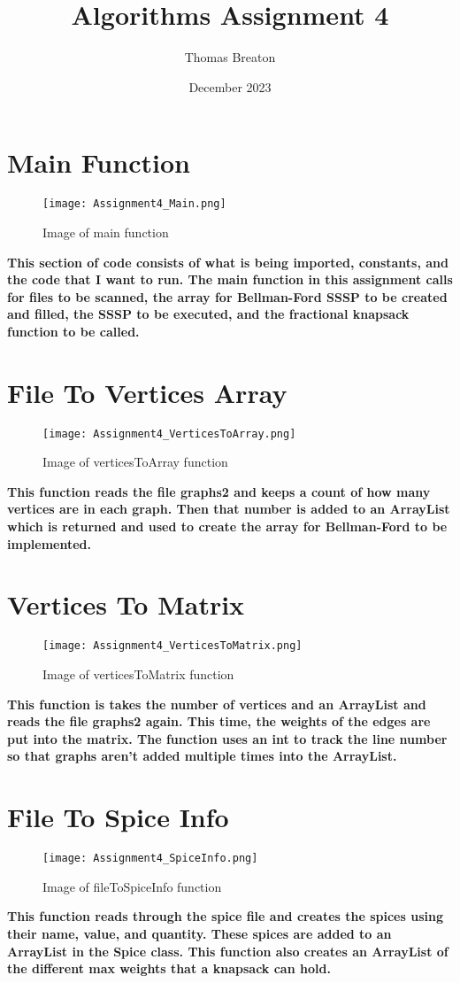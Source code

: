 \documentclass{article}
\title{Algorithms Assignment 4}
\author{Thomas Breaton }
\date{December 2023}
\begin{document}
\maketitle

\section{Main Function}
\begin{figure}[h]
    \centering
    \texttt{[image: Assignment4\_Main.png]}
    \caption{Image of main function}
    \label{fig:mainFunction}
\end{figure}
\textbf{This section of code consists of what is being imported, constants, and the code that I want to run. The main function in this assignment calls for files to be scanned, the array for Bellman-Ford SSSP to be created and filled, the SSSP to be executed, and the fractional knapsack function to be called.}
\newpage

\section{File To Vertices Array}
\begin{figure}[h]
    \centering
    \texttt{[image: Assignment4\_VerticesToArray.png]}
    \caption{Image of verticesToArray function}
    \label{fig:verticesToArray}
\end{figure}
\textbf{This function reads the file graphs2 and keeps a count of how many vertices are in each graph. Then that number is added to an ArrayList which is returned and used to create the array for Bellman-Ford to be implemented.}
\newpage

\section{Vertices To Matrix}
\begin{figure}[h]
    \centering
    \texttt{[image: Assignment4\_VerticesToMatrix.png]}
    \caption{Image of verticesToMatrix function}
    \label{fig:verticesToMatrixFunction}
\end{figure}
\textbf{This function is takes the number of vertices and an ArrayList and reads the file graphs2 again. This time, the weights of the edges are put into the matrix. The function uses an int to track the line number so that graphs aren't added multiple times into the ArrayList.}
\newpage

\section{File To Spice Info}
\begin{figure}[h]
    \centering
    \texttt{[image: Assignment4\_SpiceInfo.png]}
    \caption{Image of fileToSpiceInfo function}
    \label{fig:fileToSpiceInfoFunction}
\end{figure}
\textbf{This function reads through the spice file and creates the spices using their name, value, and quantity. These spices are added to an ArrayList in the Spice class. This function also creates an ArrayList of the different max weights that a knapsack can hold.}
\newpage
\end{document}
